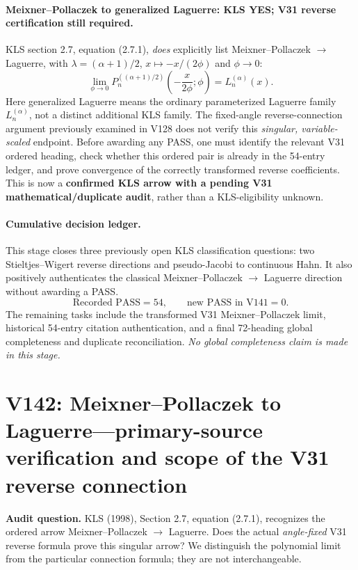 \documentclass[11pt]{article}
\begin{document}
\paragraph{Meixner--Pollaczek to generalized Laguerre: KLS YES;
V31 reverse certification still required.}
KLS section 2.7, equation (2.7.1), \emph{does} explicitly list
Meixner--Pollaczek $\to$ Laguerre, with
$\lambda=(\alpha+1)/2$, $x\mapsto-x/(2\phi)$ and $\phi\to0$:
\[
 \lim_{\phi\to0}
 P_n^{((\alpha+1)/2)}\!\left(-\frac{x}{2\phi};\phi\right)
 =L_n^{(\alpha)}(x).
\]
Here generalized Laguerre means the ordinary parameterized Laguerre
family $L_n^{(\alpha)}$, not a distinct additional KLS family.
The fixed-angle reverse-connection argument previously examined in
V128 does not verify this \emph{singular, variable-scaled} endpoint.
Before awarding any PASS, one must identify the relevant V31 ordered
heading, check whether this ordered pair is already in the 54-entry
ledger, and prove convergence of the correctly transformed reverse
coefficients.  This is now a \textbf{confirmed KLS arrow with a pending
V31 mathematical/duplicate audit}, rather than a KLS-eligibility unknown.

\paragraph{Cumulative decision ledger.}
This stage closes three previously open KLS classification questions:
two Stieltjes--Wigert reverse directions and pseudo-Jacobi to
continuous Hahn.  It also positively authenticates the classical
Meixner--Pollaczek $\to$ Laguerre direction without awarding a PASS.
\[
 \boxed{\text{Recorded PASS}=54,\qquad
 \text{new PASS in V141}=0.}
\]
The remaining tasks include the transformed V31 Meixner--Pollaczek
limit, historical 54-entry citation authentication, and a final
72-heading global completeness and duplicate reconciliation.
\emph{No global completeness claim is made in this stage.}


\clearpage
\section{V142: Meixner--Pollaczek to Laguerre---primary-source verification and scope of the V31 reverse connection}
\noindent\textbf{Audit question.} KLS (1998), Section 2.7, equation (2.7.1), recognizes the ordered arrow Meixner--Pollaczek $\to$ Laguerre. Does the actual \emph{angle-fixed} V31 reverse formula prove this singular arrow? We distinguish the polynomial limit from the particular connection formula; they are not interchangeable.
\end{document}
